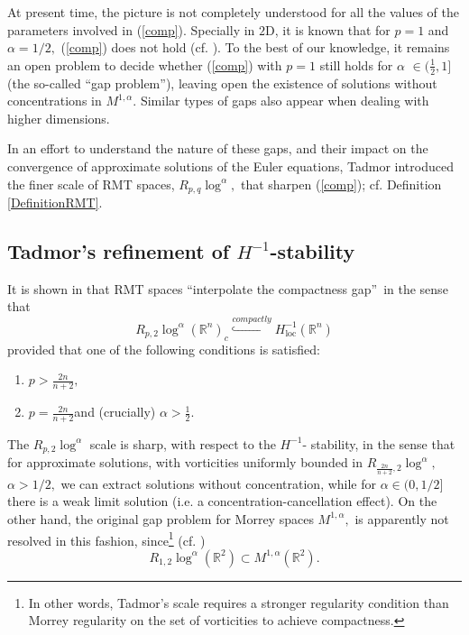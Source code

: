 \documentclass[11pt, a4paper,leqno]{amsart}
\theoremstyle{plain}
\numberwithin{equation}{section}
\theoremstyle{definition}
\theoremstyle{remark}
\def\R{\mathbb{R}}
\begin{document}
At present time, the picture is not
completely understood for all the values of the parameters involved in
(\ref{comp}). Specially in $2$D, it is known that for $p=1$ and $\alpha=1/2,$
(\ref{comp}) does not hold (cf. \cite{DiPernaMajda, M93}). To the best of our knowledge, it
remains an open problem to decide whether (\ref{comp}) with $p=1$ still holds  for $\alpha$ $\in(\frac{1}%
{2},1]$ (the so-called \textquotedblleft gap problem\textquotedblright), leaving open the existence of solutions without concentrations in $M^{1, \alpha}$. 
Similar types of gaps also appear when dealing with higher dimensions.

In an effort to understand the nature of these gaps, and their impact on the
convergence of approximate solutions of the Euler equations, Tadmor
\cite{Tadmor} introduced the finer scale of RMT spaces, $R_{p,q}\log^{\alpha},$ that sharpen (\ref{comp}); cf. Definition \ref{DefinitionRMT}. 

\subsection{Tadmor's refinement of $H^{-1}$-stability\label{sec:tad}}

It is shown in \cite{Tadmor} that RMT spaces
\textquotedblleft interpolate the compactness gap\textquotedblright\ in the
sense that%
\begin{equation}
R_{p,2}\log^{\alpha} (\R^n)_c\overset{compactly}{\hookrightarrow}H_{\text{loc}}%
^{-1}(\R^n)\label{comp1}%
\end{equation}
provided that one of the following conditions is satisfied:
\begin{enumerate}
\item[(a)] $p>\frac{2n}{n+2},$
\item[(b)] $p=\frac{2n}{n+2}$\quad  and (crucially) \quad $\alpha>\frac{1}{2}.$
\end{enumerate}

The $R_{p,2}\log^{\alpha}$ scale is sharp, with respect to the $H^{-1}$-
stability, in the sense that for approximate solutions, with vorticities
uniformly bounded in $R_{\frac{2n}{n+2},2}\log^{\alpha},$ $\alpha>1/2,$
we can extract solutions without concentration, while for $\alpha\in(0,1/2]$
there is a weak limit solution (i.e. a concentration-cancellation effect). On
the other hand, the original gap problem for Morrey spaces $M^{1,\alpha},$ is
apparently not resolved in this fashion, since\footnote{In other words, Tadmor's scale requires a stronger
regularity condition than Morrey regularity on the set of vorticities to
achieve compactness.} (cf. \cite[page 519 and the discussion after 
(3.5)]{Tadmor})
\begin{equation*}
R_{1,2}\log^{\alpha}(\mathbb{R}^{2})\subset M^{1,\alpha}(\mathbb{R}%
^{2}).
\end{equation*}
\end{document}

